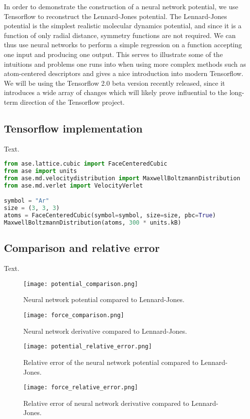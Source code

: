 In order to demonstrate the construction of a neural network
potential, we use Tensorflow to reconstruct the Lennard-Jones
potential. The Lennard-Jones potential is the simplest
realistic molecular dynamics potential, and since it is a function
of only radial distance, symmetry functions are not required.
We can thus use neural networks to perform a simple regression
on a function accepting one input and producing one output.
This serves to illustrate some of the intuitions and problems
one runs into when using more complex methods such as 
atom-centered descriptors and gives a nice introduction into
modern Tensorflow. We will be using the Tensorflow 2.0
beta version recently released, since it introduces a wide array
of changes which will likely prove influential to the long-term
direction of the Tensorflow project.

\subsection{Tensorflow implementation}
Text.

\begin{lstlisting}[language=python,basicstyle=\small]
from ase.lattice.cubic import FaceCenteredCubic
from ase import units
from ase.md.velocitydistribution import MaxwellBoltzmannDistribution
from ase.md.verlet import VelocityVerlet

symbol = "Ar"
size = (3, 3, 3)
atoms = FaceCenteredCubic(symbol=symbol, size=size, pbc=True)
MaxwellBoltzmannDistribution(atoms, 300 * units.kB)
\end{lstlisting}

\subsection{Comparison and relative error}
Text.

\begin{figure}[h]
    \centering
    \texttt{[image: potential\_comparison.png]}
    \caption{Neural network potential compared to Lennard-Jones.}
    \label{fig:potential-comparison}
\end{figure}

\begin{figure}[h]
    \centering
    \texttt{[image: force\_comparison.png]}
    \caption{Neural network derivative compared to Lennard-Jones.}
    \label{fig:force-comparison}
\end{figure}

\begin{figure}[h]
    \centering
    \texttt{[image: potential\_relative\_error.png]}
    \caption{Relative error of the neural network potential compared
        to Lennard-Jones.}
    \label{fig:potential-rel-error}
\end{figure}

\begin{figure}[h]
    \centering
    \texttt{[image: force\_relative\_error.png]}
    \caption{Relative error of neural network derivative compared
        to Lennard-Jones.}
    \label{fig:force-rel-error}
\end{figure}
